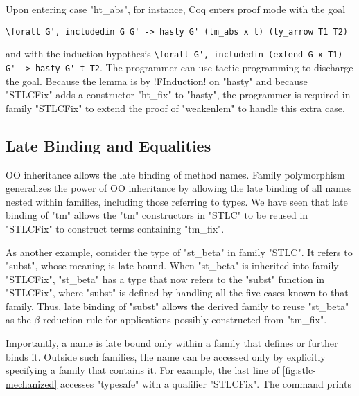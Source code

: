 \noindent
Upon entering case "ht_abs", for instance, Coq enters proof mode with the goal

\begin{centered}
\begin{minipage}{.635\textwidth}
\begin{lstlisting}[basicstyle=\fontsize{8}{9}\ttfamily]
\forall G', includedin G G' -> hasty G' (tm_abs x t) (ty_arrow T1 T2)
\end{lstlisting}
\end{minipage}
\end{centered}

\noindent
and with the induction hypothesis
\lstinline[basicstyle=\fontsize{8}{9}\ttfamily]!\forall G', includedin (extend G x T1) G' -> hasty G' t T2!.
%
The programmer can use tactic programming to discharge the goal.
Because the lemma is by \lsti!FInduction! on "hasty" and because "STLCFix" adds
a constructor "ht_fix" to "hasty", the programmer is required in family "STLCFix" to
extend the proof of "weakenlem" to handle this extra case.


\subsection{Late Binding and Equalities}
\label{sec:latebind}


OO inheritance allows the late binding of method names.
Family polymorphism generalizes the power of OO inheritance by allowing the
late binding of all names nested within families, including those referring to types.
We have seen that late binding of "tm" allows the "tm" constructors in "STLC"
to be reused in "STLCFix" to construct terms containing "tm_fix".

As another example, consider the type of "st_beta" in family "STLC".
It refers to "subst", whose meaning is late bound.
When "st_beta" is inherited into family "STLCFix", "st_beta" has a type that now
refers to the "subst" function in "STLCFix", where "subst" is defined
by handling all the five cases known to that family.
Thus, late binding of "subst" allows the derived family to reuse "st_beta"
as the $\beta$-reduction rule for applications possibly constructed from "tm_fix".

Importantly, a name is late bound only within a family that defines or further binds it.
Outside such families, the name can be accessed only by explicitly
specifying a family that contains it.
For example, the last line of \cref{fig:stlc-mechanized} accesses "typesafe"
with a qualifier "STLCFix".
The command prints

